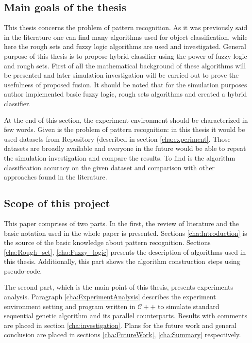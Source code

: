 \subsection{Main goals of the thesis}
This thesis concerns the problem of pattern recognition. As it was previously
said in the literature one can find many algorithms used for object
classification, while here the rough sets and fuzzy logic algorithms are used 
and investigated. General purpose of this thesis is to propose hybrid
classifier using the power of fuzzy logic and rough sets. First of all the
mathematical background of these algorithms will be presented and later
simulation investigation will be carried out to prove the usefulness of
proposed fusion. It should be noted that for the simulation purposes author
implemented basic fuzzy logic, rough sets algorithms and created a hybrid
classifier.

At the end of this section, the experiment environment should be characterized in
few words. Given is the problem of pattern recognition: in this thesis it would
be used datasets from  Repository (described in section
\ref{cha:experiment}. Those datasets are broadly available and everyone in the
future would be able to repeat the simulation investigation and compare the
results. To find is the algorithm classification accuracy on the given dataset
and comparison with other approaches found in the literature. 

\subsection{Scope of this project}
This paper comprises of two parts. In the first, the review of
literature and the basic notation used in the whole paper is presented. Sections
\ref{cha:Introduction} is the source of the basic
knowledge about pattern recognition. Sections \ref{cha:Rough_set}, \ref{cha:Fuzzy_logic}
presents the description of algorithms used in this thesis. Additionally, this
part shows the algorithm construction steps using pseudo-code.

The second part, which is the main point of this thesis, presents experiments analysis.
Paragraph \ref{cha:ExperimentAnalysis} describes the experiment environment
setting and program written in $\mathcal{C++}$ to simulate standard sequential genetic
algorithm and its parallel counterparts. Results with comments are placed in
section \ref{cha:investigation}. Plans for the future work and general
conclusion are placed in sections \ref{cha:FutureWork}, \ref{cha:Summary}
respectively. 

